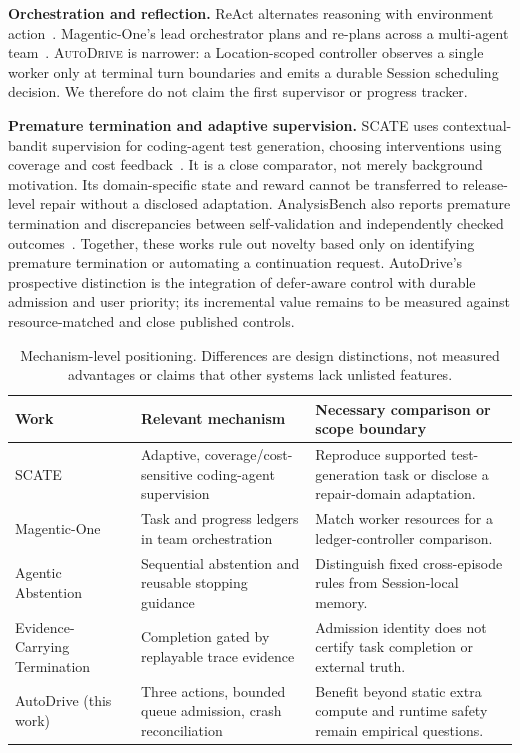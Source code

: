 \documentclass[sigconf,nonacm]{acmart}
\newcommand{\system}{\textsc{AutoDrive}}
\begin{document}
\textbf{Orchestration and reflection.} ReAct alternates reasoning with environment action~\cite{yao2023react}. Magentic-One's lead orchestrator plans and re-plans across a multi-agent team~\cite{fourney2024magenticone}. \system{} is narrower: a Location-scoped controller observes a single worker only at terminal turn boundaries and emits a durable Session scheduling decision. We therefore do not claim the first supervisor or progress tracker.

\textbf{Premature termination and adaptive supervision.} SCATE uses contextual-bandit supervision for coding-agent test generation, choosing interventions using coverage and cost feedback~\cite{gu2026scate}. It is a close comparator, not merely background motivation. Its domain-specific state and reward cannot be transferred to release-level repair without a disclosed adaptation. AnalysisBench also reports premature termination and discrepancies between self-validation and independently checked outcomes~\cite{bouzenia2026analysisbench}. Together, these works rule out novelty based only on identifying premature termination or automating a continuation request. AutoDrive's prospective distinction is the integration of defer-aware control with durable admission and user priority; its incremental value remains to be measured against resource-matched and close published controls.

\begin{table}[t]
  \caption{Mechanism-level positioning. Differences are design distinctions, not measured advantages or claims that other systems lack unlisted features.}
  \label{tab:related}
  \centering\small
  \begin{tabular}{p{}p{}p{}}
    \toprule
    Work & Relevant mechanism & Necessary comparison or scope boundary \\
    \midrule
    SCATE~\cite{gu2026scate} & Adaptive, coverage/cost-sensitive coding-agent supervision & Reproduce supported test-generation task or disclose a repair-domain adaptation. \\
    Magentic-One~\cite{fourney2024magenticone} & Task and progress ledgers in team orchestration & Match worker resources for a ledger-controller comparison. \\
    Agentic Abstention~\cite{luo2026abstention} & Sequential abstention and reusable stopping guidance & Distinguish fixed cross-episode rules from Session-local memory. \\
    Evidence-Carrying Termination~\cite{liu2026ect} & Completion gated by replayable trace evidence & Admission identity does not certify task completion or external truth. \\
    AutoDrive (this work) & Three actions, bounded queue admission, crash reconciliation & Benefit beyond static extra compute and runtime safety remain empirical questions. \\
    \bottomrule
  \end{tabular}
\end{table}
\end{document}
